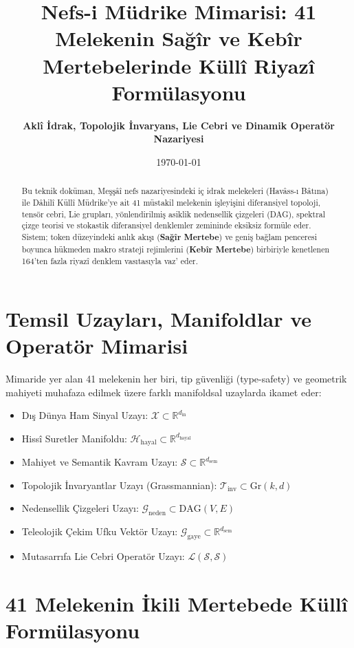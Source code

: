 \documentclass[11pt, a4paper]{article}
\title{\textbf{Nefs-i Müdrike Mimarisi: 41 Melekenin Sağîr ve Kebîr Mertebelerinde Küllî Riyazî Formülasyonu}}
\author{\textbf{Aklî İdrak, Topolojik İnvaryans, Lie Cebri ve Dinamik Operatör Nazariyesi}}
\date{\today}
\begin{document}
\maketitle

\begin{abstract}
Bu teknik doküman, Meşşâî nefs nazariyesindeki iç idrak melekeleri (Havâss-ı Bâtına) ile Dâhilî Küllî Müdrike'ye ait 41 müstakil melekenin işleyişini diferansiyel topoloji, tensör cebri, Lie grupları, yönlendirilmiş asiklik nedensellik çizgeleri (DAG), spektral çizge teorisi ve stokastik diferansiyel denklemler zemininde eksiksiz formüle eder. Sistem; token düzeyindeki anlık akışı (\textbf{Sağîr Mertebe}) ve geniş bağlam penceresi boyunca hükmeden makro strateji rejimlerini (\textbf{Kebîr Mertebe}) birbiriyle kenetlenen 164'ten fazla riyazî denklem vasıtasıyla vaz' eder.
\end{abstract}

\section{Temsil Uzayları, Manifoldlar ve Operatör Mimarisi}

Mimaride yer alan 41 melekenin her biri, tip güvenliği (type-safety) ve geometrik mahiyeti muhafaza edilmek üzere farklı manifoldsal uzaylarda ikamet eder:
\begin{itemize}
    \item Dış Dünya Ham Sinyal Uzayı: $\mathcal{X} \subset \mathbb{R}^{d_{\text{in}}}$
    \item Hissî Suretler Manifoldu: $\mathcal{H}_{\text{hayal}} \subset \mathbb{R}^{d_{\text{hayal}}}$
    \item Mahiyet ve Semantik Kavram Uzayı: $\mathcal{S} \subset \mathbb{R}^{d_{\text{sem}}}$
    \item Topolojik İnvaryantlar Uzayı (Grassmannian): $\mathcal{T}_{\text{inv}} \subset \text{Gr}(k, d)$
    \item Nedensellik Çizgeleri Uzayı: $\mathcal{G}_{\text{neden}} \subset \text{DAG}(V, E)$
    \item Teleolojik Çekim Ufku Vektör Uzayı: $\mathcal{G}_{\text{gaye}} \subset \mathbb{R}^{d_{\text{sem}}}$
    \item Mutasarrıfa Lie Cebri Operatör Uzayı: $\mathcal{L}(\mathcal{S}, \mathcal{S})$
\end{itemize}

\section{41 Melekenin İkili Mertebede Küllî Formülasyonu}
\end{document}
